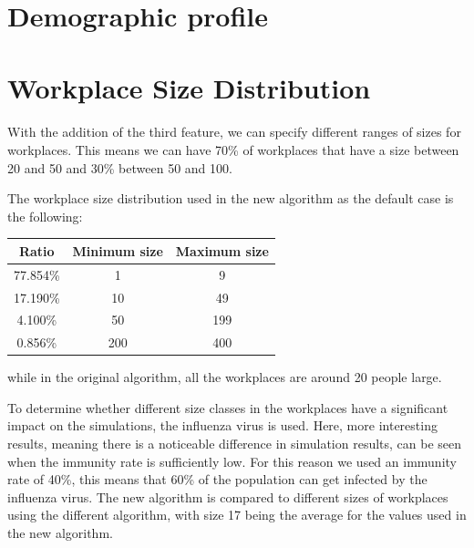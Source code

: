 \documentclass[runningheads]{llncs}
\begin{document}
\section{Demographic profile}

\section{Workplace Size Distribution}
\paragraph{}
With the addition of the third feature, we can specify different ranges of sizes for workplaces. This means we can have 70\% of workplaces that have a size between 20 and 50 and 30\% between 50 and 100.

The workplace size distribution used in the new algorithm as the default case is the following:
\begin{table}[!h]
	\centering
	\begin{tabular}{|c|c|c|}
		\hline
		Ratio & Minimum size & Maximum size \\\hline
		77.854\% & 1 & 9 \\\hline
		17.190\% & 10 & 49 \\\hline
		4.100\% & 50 & 199 \\\hline
		0.856\% & 200 & 400 \\\hline
	\end{tabular}
\end{table}

while in the original algorithm, all the workplaces are around 20 people large.

To determine whether different size classes in the workplaces have a significant impact on the simulations, the influenza virus is used.
Here, more interesting results, meaning there is a noticeable difference in simulation results, can be seen when the immunity rate is sufficiently low. For this reason we used an immunity rate of 40\%, this means that 60\% of the population can get infected by the influenza virus.
The new algorithm is compared to different sizes of workplaces using the different algorithm, with size 17 being the average for the values used in the new algorithm.
\end{document}
